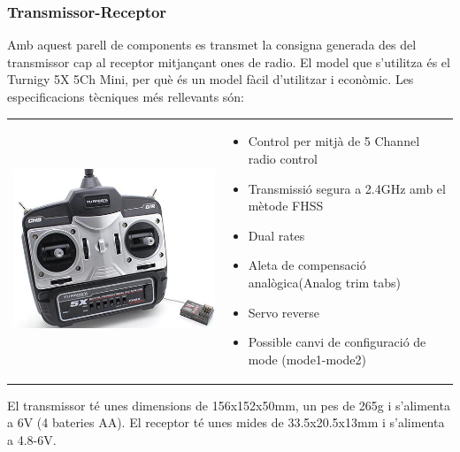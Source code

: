 \documentclass[twoside]{article}
\begin{document}
\newpage
\subsubsection*{Transmissor-Receptor}
Amb aquest parell de components es transmet la consigna generada des del transmissor cap al receptor mitjançant ones de radio. El model que s'utilitza és el Turnigy 5X 5Ch Mini, per què és un model fàcil d'utilitzar i econòmic. Les especificacions tècniques més rellevants són: 

\begin{table}[!h]
\begin{tabular}{m{4.5cm}m{10cm}}
\includegraphics[scale=0.4]{images/E_R.jpg} &
\begin{itemize}
\item Control per mitjà de 5 Channel radio control 
\item Transmissió segura a 2.4GHz amb el mètode FHSS
\item Dual rates
\item Aleta de compensació analògica(Analog trim tabs)
\item Servo reverse
\item Possible canvi de configuració de mode (mode1-mode2)
\end{itemize} \\
\end{tabular}
\end{table}
El transmissor té unes dimensions de 156x152x50mm, un pes de 265g i s'alimenta a 6V (4 bateries AA). El receptor té unes mides de 33.5x20.5x13mm i s'alimenta a 4.8-6V.
\end{document}

